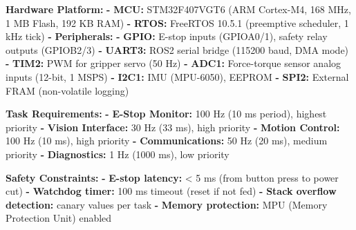 \documentclass[
]{article}
\newenvironment{Shaded}{\begin{snugshade}}{\end{snugshade}}
\newcommand{\AttributeTok}[1]{\textcolor[rgb]{0.13,0.29,0.53}{#1}}
\newcommand{\FunctionTok}[1]{\textcolor[rgb]{0.13,0.29,0.53}{\textbf{#1}}}
\newcommand{\KeywordTok}[1]{\textcolor[rgb]{0.13,0.29,0.53}{\textbf{#1}}}
\begin{document}
\begin{Shaded}
\begin{Highlighting}[]
\FunctionTok{Hardware Platform}\KeywordTok{:}
\AttributeTok{  }\KeywordTok{{-}}\AttributeTok{ }\FunctionTok{MCU}\KeywordTok{:}\AttributeTok{ STM32F407VGT6 (ARM Cortex{-}M4, 168 MHz, 1 MB Flash, 192 KB RAM)}
\AttributeTok{  }\KeywordTok{{-}}\AttributeTok{ }\FunctionTok{RTOS}\KeywordTok{:}\AttributeTok{ FreeRTOS 10.5.1 (preemptive scheduler, 1 kHz tick)}
\AttributeTok{  }\KeywordTok{{-}}\AttributeTok{ }\FunctionTok{Peripherals}\KeywordTok{:}
\AttributeTok{      }\KeywordTok{{-}}\AttributeTok{ }\FunctionTok{GPIO}\KeywordTok{:}\AttributeTok{ E{-}stop inputs (GPIOA0/1), safety relay outputs (GPIOB2/3)}
\AttributeTok{      }\KeywordTok{{-}}\AttributeTok{ }\FunctionTok{UART3}\KeywordTok{:}\AttributeTok{ ROS2 serial bridge (115200 baud, DMA mode)}
\AttributeTok{      }\KeywordTok{{-}}\AttributeTok{ }\FunctionTok{TIM2}\KeywordTok{:}\AttributeTok{ PWM for gripper servo (50 Hz)}
\AttributeTok{      }\KeywordTok{{-}}\AttributeTok{ }\FunctionTok{ADC1}\KeywordTok{:}\AttributeTok{ Force{-}torque sensor analog inputs (12{-}bit, 1 MSPS)}
\AttributeTok{      }\KeywordTok{{-}}\AttributeTok{ }\FunctionTok{I2C1}\KeywordTok{:}\AttributeTok{ IMU (MPU{-}6050), EEPROM}
\AttributeTok{      }\KeywordTok{{-}}\AttributeTok{ }\FunctionTok{SPI2}\KeywordTok{:}\AttributeTok{ External FRAM (non{-}volatile logging)}

\FunctionTok{Task Requirements}\KeywordTok{:}
\AttributeTok{  }\KeywordTok{{-}}\AttributeTok{ }\FunctionTok{E{-}Stop Monitor}\KeywordTok{:}\AttributeTok{ 100 Hz (10 ms period), highest priority}
\AttributeTok{  }\KeywordTok{{-}}\AttributeTok{ }\FunctionTok{Vision Interface}\KeywordTok{:}\AttributeTok{ 30 Hz (33 ms), high priority}
\AttributeTok{  }\KeywordTok{{-}}\AttributeTok{ }\FunctionTok{Motion Control}\KeywordTok{:}\AttributeTok{ 100 Hz (10 ms), high priority}
\AttributeTok{  }\KeywordTok{{-}}\AttributeTok{ }\FunctionTok{Communications}\KeywordTok{:}\AttributeTok{ 50 Hz (20 ms), medium priority}
\AttributeTok{  }\KeywordTok{{-}}\AttributeTok{ }\FunctionTok{Diagnostics}\KeywordTok{:}\AttributeTok{ 1 Hz (1000 ms), low priority}

\FunctionTok{Safety Constraints}\KeywordTok{:}
\AttributeTok{  }\KeywordTok{{-}}\AttributeTok{ }\FunctionTok{E{-}stop latency}\KeywordTok{:}\AttributeTok{ \textless{} 5 ms (from button press to power cut)}
\AttributeTok{  }\KeywordTok{{-}}\AttributeTok{ }\FunctionTok{Watchdog timer}\KeywordTok{:}\AttributeTok{ 100 ms timeout (reset if not fed)}
\AttributeTok{  }\KeywordTok{{-}}\AttributeTok{ }\FunctionTok{Stack overflow detection}\KeywordTok{:}\AttributeTok{ canary values per task}
\AttributeTok{  }\KeywordTok{{-}}\AttributeTok{ }\FunctionTok{Memory protection}\KeywordTok{:}\AttributeTok{ MPU (Memory Protection Unit) enabled}
\end{Highlighting}
\end{Shaded}
\end{document}
